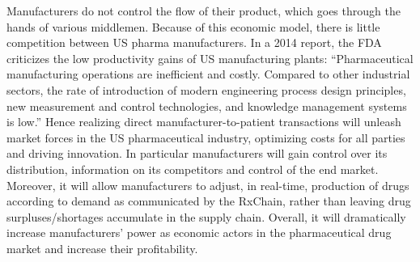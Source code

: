 Manufacturers do not control the flow of their product, which goes
through the hands of various middlemen.
Because of this economic model, there is little competition between US pharma manufacturers.
In a 2014 report, the FDA criticizes the low productivity gains of US manufacturing plants: “Pharmaceutical manufacturing operations are inefficient and costly. Compared to other industrial sectors, the rate of introduction of modern engineering process design principles, new measurement and control technologies, and knowledge management systems is low.” 
Hence realizing direct manufacturer-to-patient transactions will unleash market forces in the US pharmaceutical industry, optimizing costs for all parties and driving innovation.
In particular manufacturers will gain control over its distribution,
information on its competitors and control of the end
market. Moreover, it will allow manufacturers to adjust, in real-time,
production of drugs according to demand as communicated by the
RxChain, rather than leaving drug surpluses/shortages accumulate in
the supply chain.
Overall, it will dramatically increase manufacturers’ power as
economic actors in the pharmaceutical drug market and increase their profitability.
